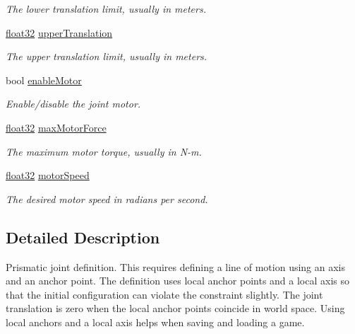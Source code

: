 \begin{DoxyCompactItemize}
\begin{DoxyCompactList}\small\item\em The lower translation limit, usually in meters. \end{DoxyCompactList}\item 
\mbox{\hyperlink{b2_settings_8h_aacdc525d6f7bddb3ae95d5c311bd06a1}{float32}} \mbox{\hyperlink{structb2_prismatic_joint_def_ae3eac123c7fe543071bdfcd1a6942350}{upper\+Translation}}
\begin{DoxyCompactList}\small\item\em The upper translation limit, usually in meters. \end{DoxyCompactList}\item 
bool \mbox{\hyperlink{structb2_prismatic_joint_def_a58ac79a54a8110d3a745e1d6d36990dc}{enable\+Motor}}
\begin{DoxyCompactList}\small\item\em Enable/disable the joint motor. \end{DoxyCompactList}\item 
\mbox{\hyperlink{b2_settings_8h_aacdc525d6f7bddb3ae95d5c311bd06a1}{float32}} \mbox{\hyperlink{structb2_prismatic_joint_def_aabeec48af1e49c7f9fed5e0bc8270a1b}{max\+Motor\+Force}}
\begin{DoxyCompactList}\small\item\em The maximum motor torque, usually in N-\/m. \end{DoxyCompactList}\item 
\mbox{\hyperlink{b2_settings_8h_aacdc525d6f7bddb3ae95d5c311bd06a1}{float32}} \mbox{\hyperlink{structb2_prismatic_joint_def_ac4bdaea15653657e724a04fc60f3f235}{motor\+Speed}}
\begin{DoxyCompactList}\small\item\em The desired motor speed in radians per second. \end{DoxyCompactList}\end{DoxyCompactItemize}


\subsection{Detailed Description}
Prismatic joint definition. This requires defining a line of motion using an axis and an anchor point. The definition uses local anchor points and a local axis so that the initial configuration can violate the constraint slightly. The joint translation is zero when the local anchor points coincide in world space. Using local anchors and a local axis helps when saving and loading a game. 

